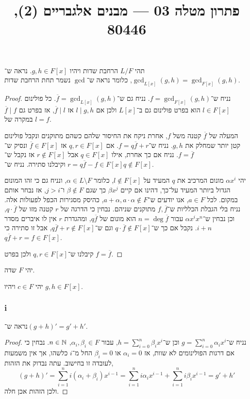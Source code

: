 
\title{פתרון מטלה 03 --- מבנים אלגבריים (2), 80446}


\maketitle
\maketitleprint[red]

\question{}
תהי $L / F$ הרחבת שדות ויהיו $g, h \in F[x]$.
נראה ש־$\gcd_{L[x]}(g, h) = \gcd_{F[x]}(g, h)$, כלומר נראה ש־$\gcd$ נשמר תחת הרחבת שדות.
\begin{proof}
	נניח ש־$f = \gcd_{F[x]}(g, h)$.
	נניח גם ש־$\overline{f} = \gcd_{L[x]}(g, h)$.
	כל פולינום $l \in F[x]$ הוא בפרט פולינום גם ב־$L[x]$ ולכן אם $l \mid g, h$ אז $\overline{f} \mid l$, אז בפרט גם $\overline{f} \mid f$ במקרה של $l = f$.

	המעלה של $\overline{f}$ קטנה משל $f$, אחרת ניקח את החיסור שלהם כשהם מתוקנים ונקבל פולינום קטן יותר שמחלק את $g, h$.
	נניח ש־$f = q \overline{f} + r$.
	אם $q, r \in F[x]$ אז $\overline{f} \in F[x]$ ונסיק ש־$f = \overline{f}$.
	נניח אם כך אחרת, אילו $q \in F[x]$ אבל $r \notin F[x]$ אז נקבל ש־$r = q \overline{f} - f \in F[x]$ וקיבלנו סתירה.
	נניח ש־$q \notin F[x]$.

	יהי $\alpha x^i$ מונום המרכיב את $q$ המעיד על $l \notin F[x]$, כלומר $\alpha \in L \setminus F$, ונניח גם כי זהו המונום הגדול ביותר המעיד על־כך, דהינו אם קיים $\beta x^j$ כך שגם $\beta \notin F$ ו־$j > i$, אז נבחר אותם במקום.
	לכל $a \in F$, אנו יודעים ש־$a + \alpha, a \cdot \alpha \notin F$, כהיסק מסגירות הכפל לפעולות אלה.
	נניח בלי הגבלת הכלליות ש־$f, \overline{f}$ מתוקנים שניהם.
	נבחין כי הדרגה של $r$ קטנה מזו של $q \cdot \overline{f}$, וכן נבחין ש־$\alpha x^i x^n$ עבור $n = \deg \overline{f}$ הוא מונום של $q \overline{f}$, ומהגדרת $r$ אין לו איברים מסדר $i + n$.
	נקבל אם כך ש־$q \cdot \overline{f} \notin F[x]$ וגם ש־$q \overline{f} + r \notin F[x]$, אבל זו סתירה כי $q \overline{f} + r = f \in F[x]$.
	
	קיבלנו ש־$q, r \in F[x]$ ולכן בפרט $f = \overline{f}$.
\end{proof}

\question{}
יהי $F$ שדה.

\subquestion{}
יהי $c \in F$ ויהיו $g, h \in F[x]$.

\subsubsection{i}
נראה ש־${(g + h)}' = g' + h'$.
\begin{proof}
	נניח ש־$g = \sum_{i = 0}^n \alpha_i x^i$ וכן ש־$h = \sum_{i = 0}^n \beta_i x^i$, עבור $\alpha_i, \beta_i \in F$, $n \in \mathbb{N}$.
	נבחין כי אם דרגות הפולינומים לא שוות, אז $\alpha_i = 0$ או $\beta_i = 0$ החל מ־$i$ כלשהו, אך אין משמעות לעובדה זו בחישוב.
	עתה נבדוק את הזהות,
	\[
		(g + h)'
		= \sum_{i = 1}^n i (\alpha_i + \beta_i) x^{i - 1}
		= \sum_{i = 1}^n i \alpha_i x^{i - 1} + \sum_{i = 1}^n i \beta_i x^{i - 1}
		= g' + h'
	\]
	ולכן הזהות אכן חלה.
\end{proof}

